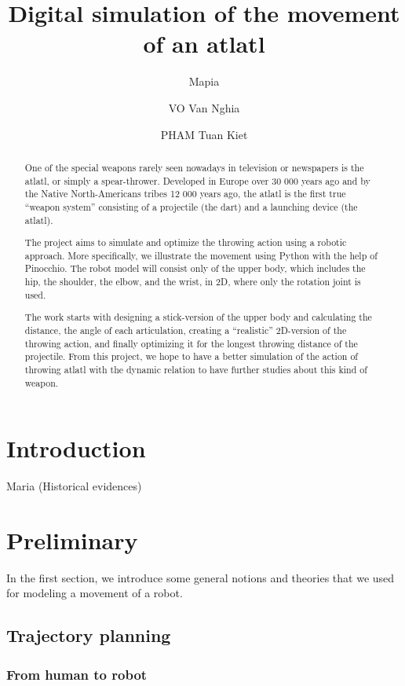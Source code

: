 \documentclass[a4paper, xcolor = usenames,dvipsnames]{article}
\title{Digital simulation of the movement of an atlatl}
\author{Μapia \and VO Van Nghia \and PHAM Tuan Kiet}
\date{}
\begin{document}
\maketitle
\begin{abstract}
One of the special weapons rarely seen nowadays in television or newspapers is the atlatl, or simply a spear-thrower. Developed in Europe over 30 000 years ago and by the Native North-Americans tribes 12 000 years ago, the atlatl is the first true ``weapon system'' consisting of a projectile (the dart) and a launching device (the atlatl).

The project aims to simulate and optimize the throwing action using a robotic approach. More specifically, we illustrate the movement using Python with the help of Pinocchio. The robot model will consist only of the upper body, which includes the hip, the shoulder, the elbow, and the wrist, in 2D, where only the rotation joint is used.

The work starts with designing a stick-version of the upper body and calculating the distance, the angle of each articulation, creating a ``realistic'' 2D-version of the throwing action, and finally optimizing it for the longest throwing distance of the projectile. From this project, we hope to have a better simulation of the action of throwing atlatl with the dynamic relation to have further studies about this kind of weapon.
\end{abstract}

\hypertarget{introduction}{%
\section{Introduction}\label{introduction}}

Maria (Historical evidences)

\hypertarget{preliminary}{%
\section{Preliminary}\label{preliminary}}

In the first section, we introduce some general notions and theories that we used for modeling a movement of a robot.

\hypertarget{trajectory-planning}{%
\subsection{Trajectory planning}\label{trajectory-planning}}

\hypertarget{from-human-to-robot}{%
\subsubsection{From human to robot}\label{from-human-to-robot}}
\end{document}
